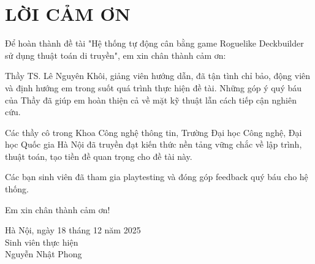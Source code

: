 \chapter*{LỜI CẢM ƠN}

\vspace{1cm}

Để hoàn thành đề tài "Hệ thống tự động cân bằng game Roguelike Deckbuilder sử dụng thuật toán di truyền", em xin chân thành cảm ơn:

Thầy TS. Lê Nguyên Khôi, giảng viên hướng dẫn, đã tận tình chỉ bảo, động viên và định hướng em trong suốt quá trình thực hiện đề tài. Những góp ý quý báu của Thầy đã giúp em hoàn thiện cả về mặt kỹ thuật lẫn cách tiếp cận nghiên cứu.

Các thầy cô trong Khoa Công nghệ thông tin, Trường Đại học Công nghệ, Đại học Quốc gia Hà Nội đã truyền đạt kiến thức nền tảng vững chắc về lập trình, thuật toán, tạo tiền đề quan trọng cho đề tài này.

Các bạn sinh viên đã tham gia playtesting và đóng góp feedback quý báu cho hệ thống.

Em xin chân thành cảm ơn!

\vspace{2cm}

\begin{flushright}
Hà Nội, ngày 18 tháng 12 năm 2025\\
Sinh viên thực hiện\\
\vspace{2cm}
Nguyễn Nhật Phong
\end{flushright}
